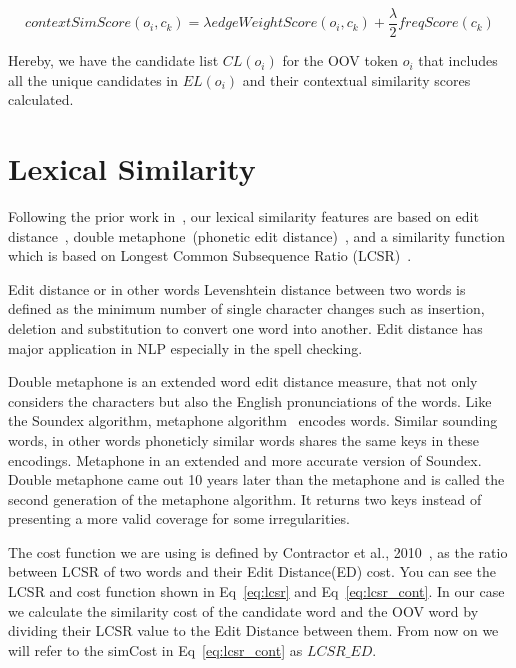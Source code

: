 \documentclass[a4paper,onesided,12pt]{report}
\begin{document}
\begin{equation}
contextSimScore(o_i,c_k) = \lambda edgeWeightScore(o_i,c_k) + \frac{\lambda} 2 freqScore(c_k)
\label{eq:contscore}
\end{equation}

Hereby, we have the candidate list $CL(o_{i})$ for the OOV token $o_i$ that includes all the unique candidates in $EL(o_{i})$ and their contextual similarity scores calculated.

\section{Lexical Similarity}

Following the prior work in~\cite{Han:2011:LNS:2002472.2002520,DBLP:conf/acl/HassanM13}, our lexical similarity features are based on edit distance~\cite{levenshtein1966bcc}, double metaphone~(phonetic edit distance)~\cite{Philips:2000:DMS:349124.349132}, and a similarity function~\cite{Contractor:2010:UCN:1944566.1944588} which is based on Longest Common Subsequence Ratio (LCSR)~\cite{melamed1999bitext}.

Edit distance or in other words Levenshtein distance between two words is defined as the minimum number of single character changes such as insertion, deletion and substitution to convert one word into another. Edit distance has major application in NLP especially in the spell checking.

Double metaphone is an extended word edit distance measure, that not only considers the characters but also the English pronunciations of the words. Like the Soundex algorithm, metaphone algorithm~\cite{philips1990hanging} encodes words. Similar sounding words, in other words phoneticly similar words shares the same keys in these encodings. Metaphone in an extended and more accurate version of Soundex. Double metaphone came out 10 years later than the metaphone and is called the second generation of the metaphone algorithm. It returns two keys instead of presenting a more valid coverage for some irregularities.

The cost function we are using is defined by Contractor et al., 2010~\cite{Contractor:2010:UCN:1944566.1944588}, as the ratio between LCSR of two words and their Edit Distance(ED) cost. You can see the LCSR and cost function shown in Eq~\ref{eq:lcsr} and Eq~\ref{eq:lcsr_cont}. In our case we calculate the similarity cost of the candidate word and the OOV word by dividing their LCSR value to the Edit Distance between them. From now on we will refer to the simCost in Eq~\ref{eq:lcsr_cont} as $LCSR\_ED$.
\end{document}
